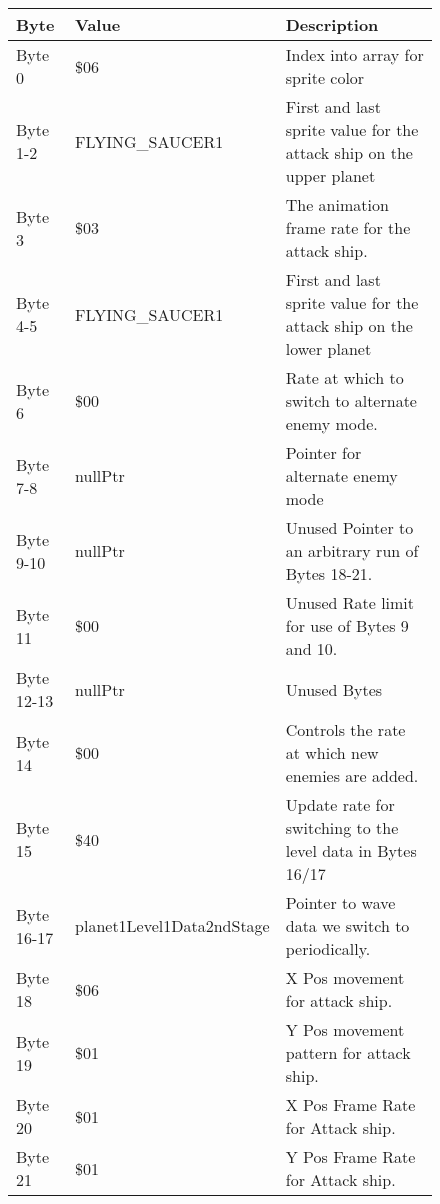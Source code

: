 \begin{figure}[H]
{\begin{adjustbox}{width=12cm}
\begin{tabular}{lll}
\toprule
 Byte       & Value                     & Description                                                         \\
\midrule
 Byte 0     & \$06                       & Index into array for sprite color                                   \\
 Byte 1-2   & FLYING\_SAUCER1            & First and last sprite value for the attack ship on the upper planet \\
 Byte 3     & \$03                       & The animation frame rate for the attack ship.                       \\
 Byte 4-5   & FLYING\_SAUCER1            & First and last sprite value for the attack ship on the lower planet \\
 Byte 6     & \$00                       & Rate at which to switch to alternate enemy mode.                    \\
 Byte 7-8   & nullPtr                   & Pointer for alternate enemy mode                                    \\
 Byte 9-10  & nullPtr                   & Unused Pointer to an arbitrary run of Bytes 18-21.                  \\
 Byte 11    & \$00                       & Unused Rate limit for use of Bytes 9 and 10.                        \\
 Byte 12-13 & nullPtr                   & Unused Bytes                                                        \\
 Byte 14    & \$00                       & Controls the rate at which new enemies are added.                   \\
 Byte 15    & \$40                       & Update rate for switching to the level data in Bytes 16/17          \\
 Byte 16-17 & planet1Level1Data2ndStage & Pointer to wave data we switch to periodically.                     \\
 Byte 18    & \$06                       & X Pos movement for attack ship.                                     \\
 Byte 19    & \$01                       & Y Pos movement pattern for attack ship.                             \\
 Byte 20    & \$01                       & X Pos Frame Rate for Attack ship.                                   \\
 Byte 21    & \$01                       & Y Pos Frame Rate for Attack ship.                                   \\

\end{tabular}
\end{adjustbox}}
\end{figure}
